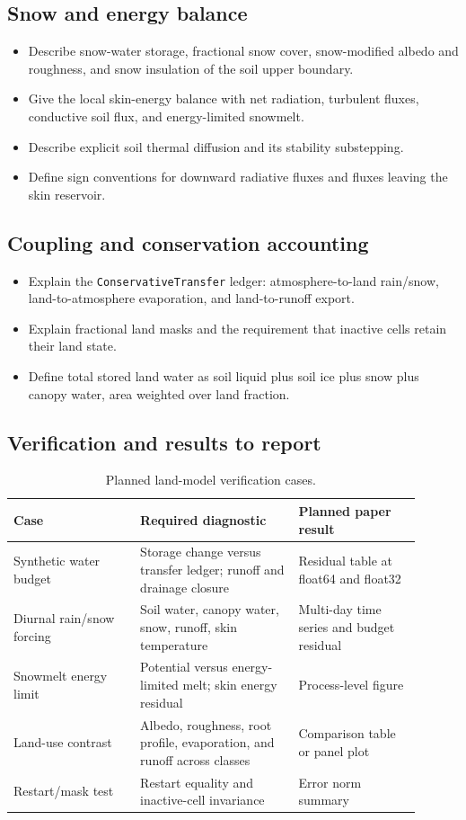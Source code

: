 \subsection{Snow and energy balance}
\begin{itemize}
  \item Describe snow-water storage, fractional snow cover, snow-modified albedo and roughness, and snow insulation of the soil upper boundary.
  \item Give the local skin-energy balance with net radiation, turbulent fluxes, conductive soil flux, and energy-limited snowmelt.
  \item Describe explicit soil thermal diffusion and its stability substepping.
  \item Define sign conventions for downward radiative fluxes and fluxes leaving the skin reservoir.
\end{itemize}

\subsection{Coupling and conservation accounting}
\begin{itemize}
  \item Explain the \texttt{ConservativeTransfer} ledger: atmosphere-to-land rain/snow, land-to-atmosphere evaporation, and land-to-runoff export.
  \item Explain fractional land masks and the requirement that inactive cells retain their land state.
  \item Define total stored land water as soil liquid plus soil ice plus snow plus canopy water, area weighted over land fraction.
\end{itemize}

\subsection{Verification and results to report}
\begin{table}[t]
\centering
\caption{Planned land-model verification cases.}
\label{tab:land-verification}
\begin{tabular}{p{0.28\linewidth}p{0.35\linewidth}p{0.27\linewidth}}
\hline
Case & Required diagnostic & Planned paper result \\
\hline
Synthetic water budget & Storage change versus transfer ledger; runoff and drainage closure & Residual table at float64 and float32 \\
Diurnal rain/snow forcing & Soil water, canopy water, snow, runoff, skin temperature & Multi-day time series and budget residual \\
Snowmelt energy limit & Potential versus energy-limited melt; skin energy residual & Process-level figure \\
Land-use contrast & Albedo, roughness, root profile, evaporation, and runoff across classes & Comparison table or panel plot \\
Restart/mask test & Restart equality and inactive-cell invariance & Error norm summary \\
\hline
\end{tabular}
\end{table}

